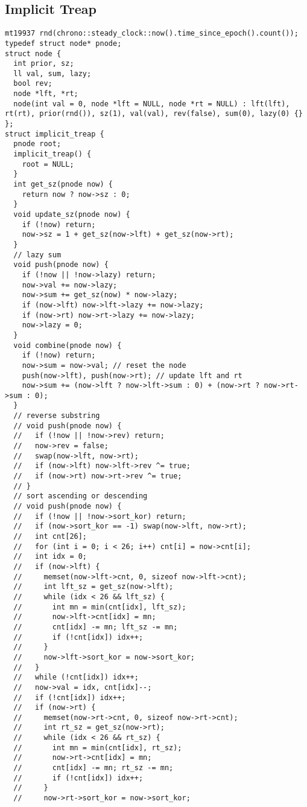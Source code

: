 \documentclass[10pt,a4paper,onesided]{article}
\begin{document}
\begin{multicols*}{3}
\subsection{Implicit Treap}
\begin{lstlisting}
mt19937 rnd(chrono::steady_clock::now().time_since_epoch().count());
typedef struct node* pnode;
struct node {
  int prior, sz;
  ll val, sum, lazy;
  bool rev;
  node *lft, *rt;
  node(int val = 0, node *lft = NULL, node *rt = NULL) : lft(lft), rt(rt), prior(rnd()), sz(1), val(val), rev(false), sum(0), lazy(0) {}
};
struct implicit_treap {
  pnode root;
  implicit_treap() {
    root = NULL;
  }
  int get_sz(pnode now) {
    return now ? now->sz : 0;
  }
  void update_sz(pnode now) {
    if (!now) return;
    now->sz = 1 + get_sz(now->lft) + get_sz(now->rt);
  }
  // lazy sum
  void push(pnode now) {
    if (!now || !now->lazy) return;
    now->val += now->lazy;
    now->sum += get_sz(now) * now->lazy;
    if (now->lft) now->lft->lazy += now->lazy;
    if (now->rt) now->rt->lazy += now->lazy;
    now->lazy = 0;
  }
  void combine(pnode now) {
    if (!now) return;
    now->sum = now->val; // reset the node
    push(now->lft), push(now->rt); // update lft and rt
    now->sum += (now->lft ? now->lft->sum : 0) + (now->rt ? now->rt->sum : 0);
  }
  // reverse substring
  // void push(pnode now) {
  //   if (!now || !now->rev) return;
  //   now->rev = false;
  //   swap(now->lft, now->rt);
  //   if (now->lft) now->lft->rev ^= true;
  //   if (now->rt) now->rt->rev ^= true;
  // }
  // sort ascending or descending
  // void push(pnode now) {
  //   if (!now || !now->sort_kor) return;
  //   if (now->sort_kor == -1) swap(now->lft, now->rt);
  //   int cnt[26];
  //   for (int i = 0; i < 26; i++) cnt[i] = now->cnt[i];
  //   int idx = 0;
  //   if (now->lft) {
  //     memset(now->lft->cnt, 0, sizeof now->lft->cnt);
  //     int lft_sz = get_sz(now->lft);
  //     while (idx < 26 && lft_sz) {
  //       int mn = min(cnt[idx], lft_sz);
  //       now->lft->cnt[idx] = mn;
  //       cnt[idx] -= mn; lft_sz -= mn;
  //       if (!cnt[idx]) idx++;
  //     }
  //     now->lft->sort_kor = now->sort_kor;
  //   }
  //   while (!cnt[idx]) idx++;
  //   now->val = idx, cnt[idx]--;
  //   if (!cnt[idx]) idx++;
  //   if (now->rt) {
  //     memset(now->rt->cnt, 0, sizeof now->rt->cnt);
  //     int rt_sz = get_sz(now->rt);
  //     while (idx < 26 && rt_sz) {
  //       int mn = min(cnt[idx], rt_sz);
  //       now->rt->cnt[idx] = mn;
  //       cnt[idx] -= mn; rt_sz -= mn;
  //       if (!cnt[idx]) idx++;
  //     }
  //     now->rt->sort_kor = now->sort_kor;

\end{lstlisting}
\end{multicols*}
\end{document}
